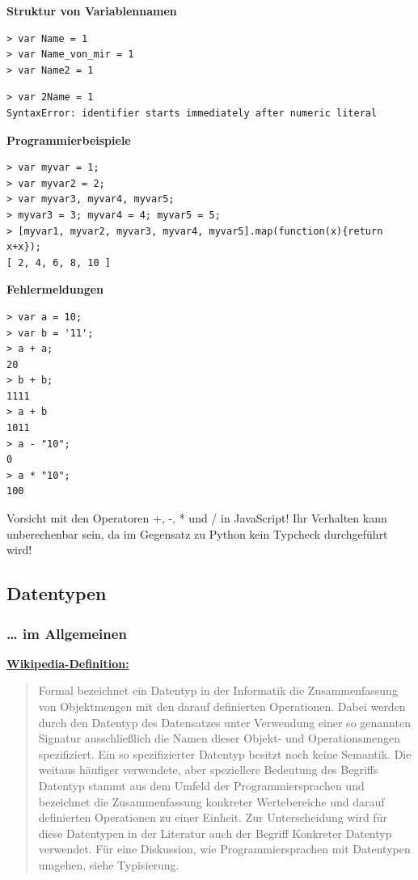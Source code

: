 \par\noindent\textbf{Struktur von Variablennamen}

\begin{verbatim}
> var Name = 1
> var Name_von_mir = 1
> var Name2 = 1
\end{verbatim}

\begin{verbatim}
> var 2Name = 1
SyntaxError: identifier starts immediately after numeric literal
\end{verbatim}



\par\noindent\textbf{Programmierbeispiele}

\begin{verbatim}
> var myvar = 1;
> var myvar2 = 2;
> var myvar3, myvar4, myvar5;
> myvar3 = 3; myvar4 = 4; myvar5 = 5;
> [myvar1, myvar2, myvar3, myvar4, myvar5].map(function(x){return x+x});
[ 2, 4, 6, 8, 10 ]
\end{verbatim}



\par\noindent\textbf{Fehlermeldungen}

\begin{verbatim}
> var a = 10;
> var b = '11';
> a + a;
20
> b + b;
1111
> a + b
1011
> a - "10";
0
> a * "10";
100
\end{verbatim}

{Vorsicht mit den Operatoren +, -, * und / in JavaScript! Ihr Verhalten
kann unberechenbar sein, da im Gegensatz zu Python kein Typcheck
durchgeführt wird!}

\subsection{\texorpdfstring{{Datentypen}}{Datentypen}}

\subsubsection{\texorpdfstring{{\ldots{} im
Allgemeinen}}{\ldots{} im Allgemeinen}}

\par\noindent\textbf{\href{http://de.wikipedia.org/wiki/Datentyp}{Wikipedia-Definition:}}

\begin{quote}
Formal bezeichnet ein Datentyp in der Informatik die Zusammenfassung von
Objektmengen mit den darauf definierten Operationen. Dabei werden durch
den Datentyp des Datensatzes unter Verwendung einer so genannten
Signatur ausschließlich die Namen dieser Objekt- und Operationsmengen
spezifiziert. Ein so spezifizierter Datentyp besitzt noch keine
Semantik. Die weitaus häufiger verwendete, aber speziellere Bedeutung
des Begriffs Datentyp stammt aus dem Umfeld der Programmiersprachen und
bezeichnet die Zusammenfassung konkreter Wertebereiche und darauf
definierten Operationen zu einer Einheit. Zur Unterscheidung wird für
diese Datentypen in der Literatur auch der Begriff Konkreter Datentyp
verwendet. Für eine Diskussion, wie Programmiersprachen mit Datentypen
umgehen, siehe Typisierung.
\end{quote}



